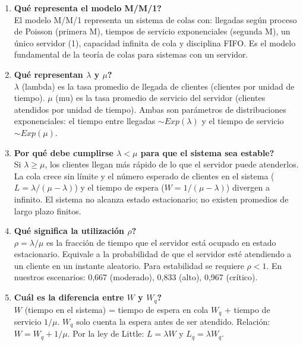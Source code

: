 \documentclass[11pt,a4paper]{article}
\begin{document}
\begin{enumerate}
    \item \textbf{\textquestiondown{}Qué representa el modelo M/M/1?}
    \\
    El modelo M/M/1 representa un sistema de colas con: llegadas según proceso
    de Poisson (primera M), tiempos de servicio exponenciales (segunda M), un
    único servidor (1), capacidad infinita de cola y disciplina FIFO. Es el
    modelo fundamental de la teoría de colas para sistemas con un servidor.

    \item \textbf{\textquestiondown{}Qué representan $\lambda$ y $\mu$?}
    \\
    $\lambda$ (lambda) es la tasa promedio de llegada de clientes (clientes por
    unidad de tiempo). $\mu$ (mu) es la tasa promedio de servicio del servidor
    (clientes atendidos por unidad de tiempo). Ambas son parámetros de
    distribuciones exponenciales: el tiempo entre llegadas $\sim Exp(\lambda)$ y
    el tiempo de servicio $\sim Exp(\mu)$.

    \item \textbf{\textquestiondown{}Por qué debe cumplirse $\lambda < \mu$ para que el
    sistema sea estable?}
    \\
    Si $\lambda \ge \mu$, los clientes llegan más rápido de lo que el servidor
    puede atenderlos. La cola crece sin límite y el número esperado de
    clientes en el sistema ($L = \lambda/(\mu-\lambda)$) y el tiempo de espera
    ($W = 1/(\mu-\lambda)$) divergen a infinito. El sistema no alcanza estado
    estacionario; no existen promedios de largo plazo finitos.

    \item \textbf{\textquestiondown{}Qué significa la utilización $\rho$?}
    \\
    $\rho = \lambda/\mu$ es la fracción de tiempo que el servidor está ocupado
    en estado estacionario. Equivale a la probabilidad de que el servidor esté
    atendiendo a un cliente en un instante aleatorio. Para estabilidad se requiere
    $\rho < 1$. En nuestros escenarios: 0,667 (moderado), 0,833 (alto), 0,967
    (crítico).

    \item \textbf{\textquestiondown{}Cuál es la diferencia entre $W$ y $W_q$?}
    \\
    $W$ (tiempo en el sistema) = tiempo de espera en cola $W_q$ + tiempo de
    servicio $1/\mu$. $W_q$ solo cuenta la espera antes de ser atendido.
    Relación: $W = W_q + 1/\mu$. Por la ley de Little: $L = \lambda W$ y
    $L_q = \lambda W_q$.


\end{enumerate}
\end{document}
